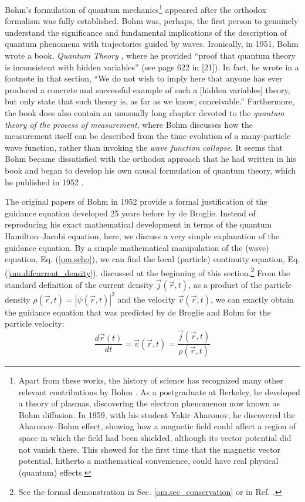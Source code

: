 \documentclass[nofootinbib, secnumarabic, amsmath, nobibnotes,11pt,aps,pra, floatfix]{revtex4-1}
\newcommand{\sref}[1]{Sec. \ref{#1}}
\newcommand{\eref}[1]{Eq. (\ref{#1})}
\begin{document}
Bohm's formulation of quantum mechanics\footnote{Apart from these
works, the history of science has recognized many other relevant
contributions by Bohm \cite{om.infinite_potential}. As a
postgraduate at Berkeley, he developed a theory of plasmas,
discovering the electron phenomenon now known as Bohm diffusion. In
1959, with his student Yakir Aharonov, he discovered the
Aharonov--Bohm effect, showing how a magnetic field could affect a
region of space in which the field had been shielded, although its
vector potential did not vanish there. This showed for the first
time that the magnetic vector potential, hitherto a mathematical
convenience, could have real physical (quantum) effects.} appeared
after the orthodox formalism was fully established. Bohm was,
perhaps, the first person to genuinely understand the significance
and fundamental implications of the description of quantum phenomena
with trajectories guided by waves. Ironically, in 1951, Bohm wrote a
book, \textit{Quantum Theory} \cite{om.bohmbook}, where he provided
``proof that quantum theory is inconsistent with hidden variables''
(see page 622 in [21]). In fact, he wrote in a footnote in that section,
``We do not wish to imply here that anyone has ever produced a
concrete and successful example of such a [hidden variables] theory,
but only state that such theory is, as far as we know,
conceivable.'' Furthermore, the book does also contain an unusually
long chapter devoted to the \textit{quantum theory of the process of
measurement}, where Bohm discusses how the measurement itself can be
described from the time evolution of a many-particle wave function, rather than
invoking the \textit{wave function collapse}. It seems that Bohm
became dissatisfied with the orthodox approach that he had written
in his book and began to develop his own causal formulation of
quantum theory, which he published in 1952
\cite{om.bohm1952a,om.bohm1952b}.

The original papers of Bohm in 1952 \cite{om.bohm1952a,om.bohm1952b} provide
a formal justification of the guidance equation developed 25 years
before by de Broglie. Instead of reproducing his exact mathematical
development in terms of the quantum Hamilton--Jacobi equation, here, we
discuss a very simple explanation of the guidance equation. By a
simple mathematical manipulation of the (wave) equation,
\eref{om.scho}, we can find the local (particle) continuity
equation, \eref{om.difcurrent_density}, discussed at the beginning
of this section.\footnote{See the formal demonstration in
\sref{om.sec_conservation} or in Ref. \cite{om.cohen}.} From the
standard definition of the current density $\vec{j}(\vec{r},t)$, as
a product of the particle density $\rho(\vec{r},t) =
|\psi(\vec{r},t)|^2$ and the velocity $\vec{v}(\vec{r},t)$, we can
exactly obtain the guidance equation that was predicted by de
Broglie and Bohm for the particle velocity:
\begin{equation}
\label{om.guidance}
\frac{d\vec{r}(t)}{dt} = \vec{v}(\vec{r},t) = \frac{\vec{j}(\vec{r},t)} {\rho(\vec{r},t)}
\end{equation}
\end{document}
